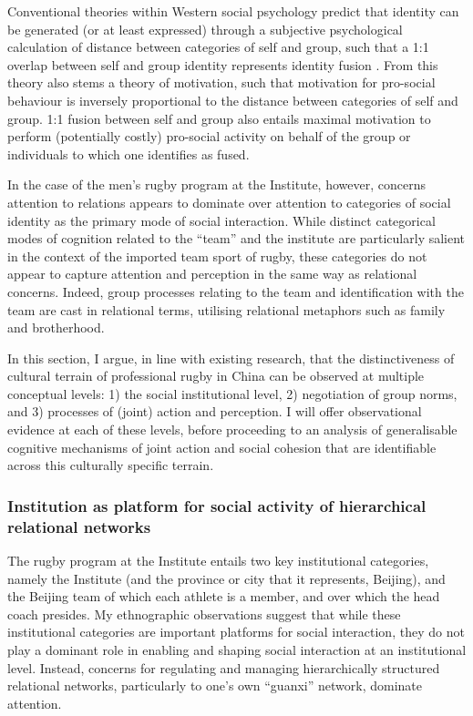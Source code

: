 \begin{CJK}{UTF8}{gbsn}
Conventional theories within Western social psychology predict that identity can be generated (or at least expressed) through a subjective psychological calculation of distance between categories of self and group, such that a 1:1 overlap between self and group identity represents identity fusion \citep{Swann2009}.  From this theory also stems a theory of motivation, such that motivation for pro-social behaviour is inversely proportional to the distance between categories of self and group. 1:1 fusion between self and group also entails maximal motivation to perform (potentially costly) pro-social activity on behalf of the group or individuals to which one identifies as fused.

In the case of the men's rugby program at the Institute, however, concerns attention to relations appears to dominate over attention to categories of social identity as the primary mode of social interaction.  While distinct categorical modes of cognition related to the ``team'' and the institute are particularly salient in the context of the imported team sport of rugby, these categories do not appear to capture attention and perception in the same way as relational concerns.  Indeed, group processes relating to the team and identification with the team are cast in relational terms, utilising relational metaphors such as family and brotherhood.

In this section, I argue, in line with existing research, that the distinctiveness of cultural terrain of professional rugby in China can be observed at multiple conceptual levels: 1) the social institutional level, 2) negotiation of group norms, and 3) processes of (joint) action and perception.  I will offer observational evidence at each of these levels, before proceeding to an analysis of generalisable cognitive mechanisms of joint action and social cohesion that are identifiable across this culturally specific terrain.

\subsubsection{Institution as platform for social activity of hierarchical relational networks}

The rugby program at the Institute entails two key institutional categories, namely the Institute (and the province or city that it represents, Beijing), and the Beijing team of which each athlete is a member, and over which the head coach presides.  My ethnographic observations suggest that while these institutional categories are important platforms for social interaction, they do not play a dominant role in enabling and shaping social interaction at an institutional level.  Instead, concerns for regulating and managing hierarchically structured relational networks, particularly to one's own ``guanxi'' network, dominate attention.


\end{CJK}
